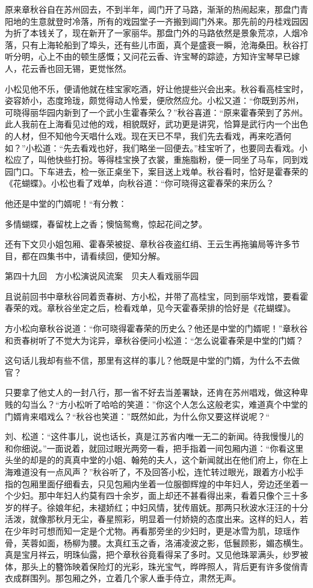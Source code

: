 \documentclass[12pt,UTF8]{ctexbook}
\begin{document}
{{{原来章秋谷自在苏州回去，不到半年，阊门开了马路，渐渐的热闹起来，那盘门青阳地的生意就登时冷落，所有的戏园堂子一齐搬到阊门外来。那先前的丹桂戏园因为折了本钱关了，现在新开了一家丽华。那盘门外的马路依然是景象荒凉，人烟冷落，只有上海轮船到了埠头，还有些儿市面，真个是盛衰一瞬，沧海桑田。秋谷打听分明，心上不由的顿生感慨；又问花云香、许宝琴的踪迹，方知许宝琴早已嫁人，花云香也回无锡，更觉怅然。

小松见他不乐，便请他就在桂宝家吃酒，好让他提些兴会出来。秋谷看高桂宝时，姿容娇小，态度玲珑，颇觉得动人怜爱，便欣然应允。小松又道：“你既到苏州，可晓得丽华园内新到了一个武小生霍春荣么？”秋谷喜道：“原来霍春荣到了苏州。此人我前在上海看见过他的戏，相貌既好，武功更是讲究，恰算是武行内一个出色的人材，但不知他今天唱什么戏。现在天已不早，我们先去看戏，再来吃酒何如？”小松道：“先去看戏也好，我们略坐一回便去。”桂宝听了，也要同去看戏。小松应了，叫他快些打扮。等得桂宝换了衣裳，重施脂粉，便一同坐了马车，同到戏园门口。下车进去，检一张正桌坐下，案目送上戏单。秋谷看时，恰好是霍春荣的《花蝴蝶》。小松也看了戏单，向秋谷道：“你可晓得这霍春荣的来历么？

他还是中堂的门婿呢！“有分教：

多情蝴蝶，春留枕上之香；懊恼鸳鸯，惊起花间之梦。

还有下文贝小姐包厢、霍春荣被捉、章秋谷夜盗红绡、王云生再拖骗局等许多节目，都在四集书中，请看续回，便知分解。





第四十九回　方小松演说风流案　贝夫人看戏丽华园





且说前回书中章秋谷同着贡春树、方小松，并带了高桂宝，同到丽华戏馆，要看霍春荣的戏。章秋谷坐定之后，检看戏单，见今天霍春荣排的恰好是《花蝴蝶》。

方小松向章秋谷说道：“你可晓得霍春荣的历史么？他还是中堂的门婿呢！”章秋谷和贡春树听了不觉大为诧异，章秋谷便问小松道：“怎么说霍春荣是中堂的门婿？

这句话儿我却有些不信，那里有这样的事儿？他既是中堂的门婿，为什么不去做官？

只要拿了他丈人的一封八行，那一省不好去当差署缺，还肯在苏州唱戏，做这种卑贱的勾当么？“方小松听了哈哈的笑道：”你这个人怎么这般老实，难道真个中堂的门婿肯来唱戏么？“秋谷也笑道：”既然如此，为什么你又要这样说呢？“

刘、松道：“这件事儿，说也话长，真是江苏省内唯一无二的新闻。待我慢慢儿的和你细说。”一面说着，就回过眼光两旁一看，把手指着一间包厢内道：“你看这里头坐的却是的的真真中堂的小姐、翰苑的夫人，这个新闻就出在他们府上，你在上海难道没有一点风声？”秋谷听了，不及回答小松，连忙转过眼光，跟着方小松手指的包厢里面仔细看去，只见包厢内坐着一位服御辉煌的中年妇人，旁边还坐着一个少妇。那中年妇人约莫有四十余岁，面上却还不甚看得出来，看着只像个三十多岁的样子。徐娘年纪，未褪娇红；中妇风情，犹传眉妩。那两只秋波水汪汪的十分活泼，就像那秋月无尘，春星照彩，明显着一付娇娆的态度出来。这样的妇人，若在少年时可想而知一定是个尤物。再看那旁坐的少妇时，更是冰雪为肌，琼瑶作骨，芙蓉如面，杨柳为腰。太真红玉之香，洛浦凌波之影，低鬟顾影，媚态横生。真是宝月祥云，明珠仙露，把个章秋谷竟看得呆了多时。又见他珠翠满头，纱罗被体，那头上的簪饰映着保险灯的光彩，珠光宝气，晔晔照人，背后更有许多俊俏青衣成群围列。那包厢之外，立着几个家人垂手侍立，肃然无声。

}}}
\end{document}
